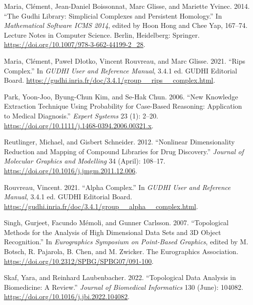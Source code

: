 \documentclass{article}
\newlength{\cslhangindent}
\newlength{\cslentryspacingunit} %
\newenvironment{CSLReferences}[2] %
 {%
  \setlength{\parindent}{0pt}
  \ifodd #1
  \let\oldpar\par
  \def\par{\hangindent=\cslhangindent\oldpar}
  \fi
  \setlength{\parskip}{#2\cslentryspacingunit}
 }%
 {}
\begin{document}
\begin{CSLReferences}{1}{0}
\leavevmode{}%
Maria, Clément, Jean-Daniel Boissonnat, Marc Glisse, and Mariette
Yvinec. 2014. {``The {Gudhi Library}: {Simplicial Complexes} and
{Persistent Homology}.''} In \emph{Mathematical {Software} \textendash{}
{ICMS} 2014}, edited by Hoon Hong and Chee Yap, 167--74. Lecture {Notes}
in {Computer Science}. {Berlin, Heidelberg}: {Springer}.
\url{https://doi.org/10.1007/978-3-662-44199-2_28}.

\leavevmode{}%
Maria, Clément, Paweł Dłotko, Vincent Rouvreau, and Marc Glisse. 2021.
{``Rips Complex.''} In \emph{{GUDHI User} and {Reference Manual}}, 3.4.1
ed. {GUDHI Editorial Board}.
\url{https://gudhi.inria.fr/doc/3.4.1/group__rips__complex.html}.

\leavevmode{}%
Park, Yoon-Joo, Byung-Chun Kim, and Se-Hak Chun. 2006. {``New Knowledge
Extraction Technique Using Probability for Case-Based Reasoning:
Application to Medical Diagnosis.''} \emph{Expert Systems} 23 (1):
2--20. \url{https://doi.org/10.1111/j.1468-0394.2006.00321.x}.

\leavevmode{}%
Reutlinger, Michael, and Gisbert Schneider. 2012. {``Nonlinear
Dimensionality Reduction and Mapping of Compound Libraries for Drug
Discovery.''} \emph{Journal of Molecular Graphics and Modelling} 34
(April): 108--17. \url{https://doi.org/10.1016/j.jmgm.2011.12.006}.

\leavevmode{}%
Rouvreau, Vincent. 2021. {``Alpha Complex.''} In \emph{{GUDHI User} and
{Reference Manual}}, 3.4.1 ed. {GUDHI Editorial Board}.
\url{https://gudhi.inria.fr/doc/3.4.1/group__alpha__complex.html}.

\leavevmode{}%
Singh, Gurjeet, Facundo Mémoli, and Gunner Carlsson. 2007.
{``Topological {Methods} for the {Analysis} of {High Dimensional Data
Sets} and {3D Object Recognition}.''} In \emph{Eurographics {Symposium}
on {Point-Based Graphics}}, edited by M. Botsch, R. Pajarola, B. Chen,
and M. Zwicker. {The Eurographics Association}.
\url{https://doi.org/10.2312/SPBG/SPBG07/091-100}.

\leavevmode{}%
Skaf, Yara, and Reinhard Laubenbacher. 2022. {``Topological Data
Analysis in Biomedicine: {A} Review.''} \emph{Journal of Biomedical
Informatics} 130 (June): 104082.
\url{https://doi.org/10.1016/j.jbi.2022.104082}.


\end{CSLReferences}
\end{document}
